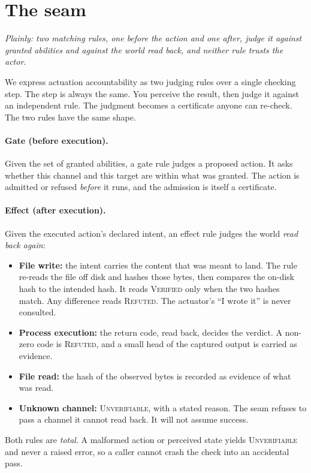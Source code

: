 \documentclass[11pt]{article}
\begin{document}
\section{The seam}
\emph{Plainly: two matching rules, one before the action and one after, judge it against granted abilities and against the world read back, and neither rule trusts the actor.}

We express actuation accountability as two judging rules over a single checking step. The step is always the same. You perceive the result, then judge it against an independent rule. The judgment becomes a certificate anyone can re-check. The two rules have the same shape.

\paragraph{Gate (before execution).} Given the set of granted abilities, a gate rule judges a proposed action. It asks whether this channel and this target are within what was granted. The action is admitted or refused \emph{before} it runs, and the admission is itself a certificate.

\paragraph{Effect (after execution).} Given the executed action's declared intent, an effect rule judges the world \emph{read back again}:
\begin{itemize}[leftmargin=*,itemsep=1pt]
\item \textbf{File write:} the intent carries the content that was meant to land. The rule re-reads the file off disk and hashes those bytes, then compares the on-disk hash to the intended hash. It reads \textsc{Verified} only when the two hashes match. Any difference reads \textsc{Refuted}. The actuator's ``I wrote it'' is never consulted.
\item \textbf{Process execution:} the return code, read back, decides the verdict. A non-zero code is \textsc{Refuted}, and a small head of the captured output is carried as evidence.
\item \textbf{File read:} the hash of the observed bytes is recorded as evidence of what was read.
\item \textbf{Unknown channel:} \textsc{Unverifiable}, with a stated reason. The seam refuses to pass a channel it cannot read back. It will not assume success.
\end{itemize}
Both rules are \emph{total}. A malformed action or perceived state yields \textsc{Unverifiable} and never a raised error, so a caller cannot crash the check into an accidental pass.
\end{document}
